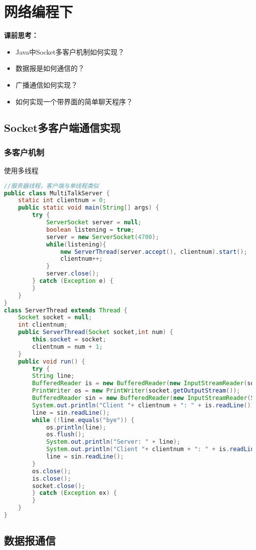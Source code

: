 \chapter{网络编程下}
\textbf{课前思考：}
\begin{itemize}
	\item Java中Socket多客户机制如何实现？
	\item 数据报是如何通信的？
	\item 广播通信如何实现？
	\item 如何实现一个带界面的简单聊天程序？
\end{itemize}
\section{Socket多客户端通信实现}
\subsection{多客户机制}
使用多线程
\begin{lstlisting}[language=java]
//服务器线程，客户端与单线程类似
public class MultiTalkServer {
	static int clientnum = 0;
	public static void main(String[] args) {
		try {
			ServerSocket server = null;
			boolean listening = true;
			server = new ServerSocket(4700);
			while(listening){
				new ServerThread(server.accept(), clientnum).start();
				clientnum++;
			}
			server.close();
		} catch (Exception e) {
		}
	}
}
class ServerThread extends Thread {
	Socket socket = null;
	int clientnum;
	public ServerThread(Socket socket,int num) {
		this.socket = socket;
		clientnum = num + 1;
	}
	public void run() {
		try {
		String line;
		BufferedReader is = new BufferedReader(new InputStreamReader(socket.getInputStream()));
		PrintWriter os = new PrintWriter(socket.getOutputStream());
		BufferedReader sin = new BufferedReader(new InputStreamReader(System.in));
		System.out.println("Client "+ clientnum + ": " + is.readLine());
		line = sin.readLine();
		while (!line.equals("bye")) {
			os.println(line);
			os.flush();
			System.out.println("Server: " + line);
			System.out.println("Client "+ clientnum + ": " + is.readLine());
			line = sin.readLine();
		}
		os.close();
		is.close();
		socket.close();
		} catch (Exception ex) {
		}
	}
}
\end{lstlisting}
\section{数据报通信}
